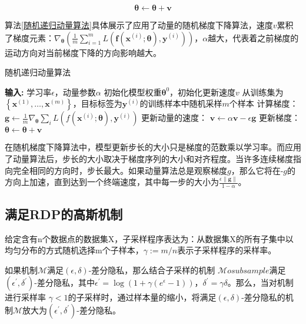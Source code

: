 \begin{equation}\label{动量更新梯度2}
\boldsymbol{\theta} \leftarrow \boldsymbol{\theta}+\boldsymbol{v}
\end{equation}

算法\ref{随机递归动量算法}具体展示了应用了动量的随机梯度下降算法，速度$v$累积了梯度元素：$\nabla_{\boldsymbol{\theta}}\left(\frac{1}{m} \sum_{i=1}^{m} L\left(\boldsymbol{f}\left(\boldsymbol{x}^{(i)} ; \boldsymbol{\theta}\right), \boldsymbol{y}^{(i)}\right)\right)$，$\alpha$越大，代表着之前梯度的运动方向对当前梯度下降的方向影响越大。

\begin{algorithm}[!htb]
	\caption{随机递归动量算法}
	\label{随机递归动量算法}
	\begin{algorithmic}[1]
		\footnotesize
		\STATE \textbf{输入:} 学习率$\epsilon$，动量参数$\alpha$
		\STATE 初始化模型权重$\boldsymbol{\theta}^{0}$，初始化更新速度$v$
			\STATE 从训练集为$\left\{\boldsymbol{x}^{(1)}, \ldots,\boldsymbol{x}^{(m)}\right\}$，目标标签为$\boldsymbol{y}^{(i)}$的训练样本中随机采样$m$个样本
			\STATE 计算梯度：$\boldsymbol{g} \leftarrow \frac{1}{m} \nabla_{\boldsymbol{\theta}} \sum_{i} L\left(f\left(\boldsymbol{x}^{(i)} ; \boldsymbol{\theta}\right), \boldsymbol{y}^{(i)}\right)$
			\STATE 更新动量的速度： $\boldsymbol{v} \leftarrow \alpha \boldsymbol{v}-\epsilon \boldsymbol{g}$
			\STATE 更新梯度：$\boldsymbol{\theta} \leftarrow \boldsymbol{\theta}+\boldsymbol{v}$
		\ENDWHILE
	\end{algorithmic}
\end{algorithm}

在随机梯度下降算法中，模型更新步长的大小只是梯度的范数乘以学习率。而应用了动量算法后，步长的大小取决于梯度序列的大小和对齐程度。当许多连续梯度指向完全相同的方向时，步长最大。如果动量算法总是观察梯度$g$，那么它将在-$g$的方向上加速，直到达到一个终端速度，其中每一步的大小为$\frac{\epsilon\|\boldsymbol{g}\|}{1-\alpha}$。

\subsection{满足RDP的高斯机制}
\begin{theorem}\label{子采样}
给定含有n个数据点的数据集X，子采样程序表达为：从数据集X的所有子集中以均匀分布的方式随机选择m个子样本，$\gamma:=m / n$表示子采样程序的采样率。
\end{theorem}

如果机制$\mathcal{M}$满足$(\epsilon, \delta)$-差分隐私，那么结合子采样的机制 $\mathcal{M}  o   subsample$满足$\left(\epsilon^{\prime}, \delta^{\prime}\right)$-差分隐私，其中$\epsilon^{\prime}=\log \left(1+\gamma\left(e^{\epsilon}-1\right)\right)$，$\delta^{\prime}=\gamma \delta$。那么，当对机制进行采样率 $\gamma<1$的子采样时，通过样本量的缩小，将满足$(\epsilon, \delta)$-差分隐私的机制$\mathcal{M}$放大为$\left(\epsilon^{\prime}, \delta^{\prime}\right)$-差分隐私。

